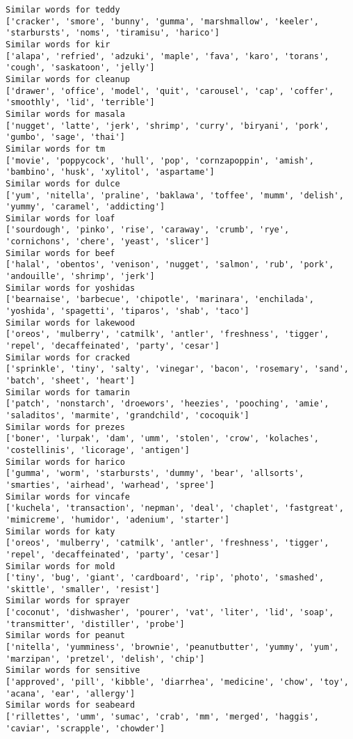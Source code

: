 \documentclass[11pt]{article}
\begin{document}
\begin{Verbatim}[commandchars=\\\{\}]
Similar words for teddy
['cracker', 'smore', 'bunny', 'gumma', 'marshmallow', 'keeler', 'starbursts', 'noms', 'tiramisu', 'harico']
Similar words for kir
['alapa', 'refried', 'adzuki', 'maple', 'fava', 'karo', 'torans', 'cough', 'saskatoon', 'jelly']
Similar words for cleanup
['drawer', 'office', 'model', 'quit', 'carousel', 'cap', 'coffer', 'smoothly', 'lid', 'terrible']
Similar words for masala
['nugget', 'latte', 'jerk', 'shrimp', 'curry', 'biryani', 'pork', 'gumbo', 'sage', 'thai']
Similar words for tm
['movie', 'poppycock', 'hull', 'pop', 'cornzapoppin', 'amish', 'bambino', 'husk', 'xylitol', 'aspartame']
Similar words for dulce
['yum', 'nitella', 'praline', 'baklawa', 'toffee', 'mumm', 'delish', 'yummy', 'caramel', 'addicting']
Similar words for loaf
['sourdough', 'pinko', 'rise', 'caraway', 'crumb', 'rye', 'cornichons', 'chere', 'yeast', 'slicer']
Similar words for beef
['halal', 'obentos', 'venison', 'nugget', 'salmon', 'rub', 'pork', 'andouille', 'shrimp', 'jerk']
Similar words for yoshidas
['bearnaise', 'barbecue', 'chipotle', 'marinara', 'enchilada', 'yoshida', 'spagetti', 'tiparos', 'shab', 'taco']
Similar words for lakewood
['oreos', 'mulberry', 'catmilk', 'antler', 'freshness', 'tigger', 'repel', 'decaffeinated', 'party', 'cesar']
Similar words for cracked
['sprinkle', 'tiny', 'salty', 'vinegar', 'bacon', 'rosemary', 'sand', 'batch', 'sheet', 'heart']
Similar words for tamarin
['patch', 'nonstarch', 'droewors', 'heezies', 'pooching', 'amie', 'saladitos', 'marmite', 'grandchild', 'cocoquik']
Similar words for prezes
['boner', 'lurpak', 'dam', 'umm', 'stolen', 'crow', 'kolaches', 'costellinis', 'licorage', 'antigen']
Similar words for harico
['gumma', 'worm', 'starbursts', 'dummy', 'bear', 'allsorts', 'smarties', 'airhead', 'warhead', 'spree']
Similar words for vincafe
['kuchela', 'transaction', 'nepman', 'deal', 'chaplet', 'fastgreat', 'mimicreme', 'humidor', 'adenium', 'starter']
Similar words for katy
['oreos', 'mulberry', 'catmilk', 'antler', 'freshness', 'tigger', 'repel', 'decaffeinated', 'party', 'cesar']
Similar words for mold
['tiny', 'bug', 'giant', 'cardboard', 'rip', 'photo', 'smashed', 'skittle', 'smaller', 'resist']
Similar words for sprayer
['coconut', 'dishwasher', 'pourer', 'vat', 'liter', 'lid', 'soap', 'transmitter', 'distiller', 'probe']
Similar words for peanut
['nitella', 'yumminess', 'brownie', 'peanutbutter', 'yummy', 'yum', 'marzipan', 'pretzel', 'delish', 'chip']
Similar words for sensitive
['approved', 'pill', 'kibble', 'diarrhea', 'medicine', 'chow', 'toy', 'acana', 'ear', 'allergy']
Similar words for seabeard
['rillettes', 'umm', 'sumac', 'crab', 'mm', 'merged', 'haggis', 'caviar', 'scrapple', 'chowder']

\end{Verbatim}
\end{document}
